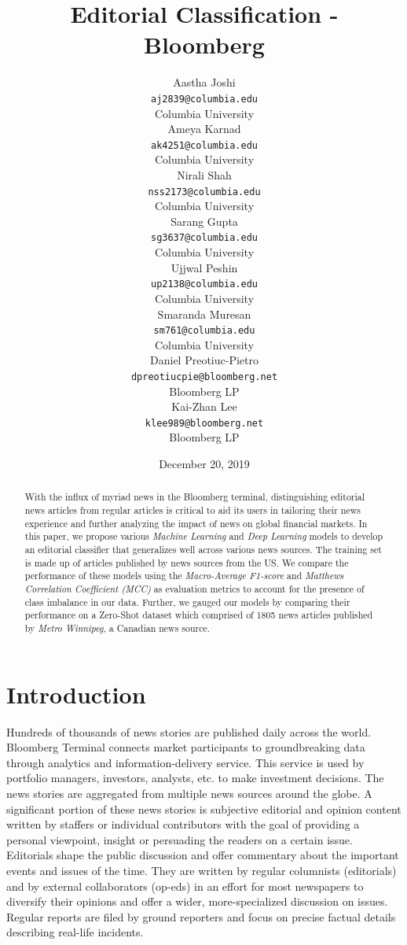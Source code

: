 \documentclass[11pt]{article}
\title{Editorial Classification - Bloomberg\vspace{1em}}
\author{
  Aastha Joshi\\
  \texttt{aj2839@columbia.edu}\\
  Columbia University
  \\\And
  Ameya Karnad\\
  \texttt{ak4251@columbia.edu}\\
  Columbia University
  \\\And
  Nirali Shah\\
  \texttt{nss2173@columbia.edu}\\
  Columbia University
  \\\AND
  Sarang Gupta\\
  \texttt{sg3637@columbia.edu}\\
  Columbia University
  \\\And
  Ujjwal Peshin\\
  \texttt{up2138@columbia.edu}\\
  Columbia University
  \\\And
  Smaranda Muresan\\
  \texttt{sm761@columbia.edu}\\
  Columbia University
  \\\AND
  Daniel Preotiuc-Pietro\\
  \texttt{dpreotiucpie@bloomberg.net}\\
  Bloomberg LP
  \\\And
  Kai-Zhan Lee\\
  \texttt{klee989@bloomberg.net}\\
  Bloomberg LP
  \\\vspace{5em}
}
\date{December 20, 2019}
\begin{document}
\maketitle
\bigskip\bigskip
\bigskip\bigskip


\begin{abstract}
 With the influx of myriad news in the Bloomberg terminal, distinguishing editorial news articles from regular articles is critical to aid its users in tailoring their news experience and further analyzing the impact of news on global financial markets. In this paper, we propose various \textit{Machine Learning} and \textit{Deep Learning} models to develop an editorial classifier that generalizes well across various news sources. The training set is made up of articles published by news sources from the US. We compare the performance of these models using the \textit{Macro-Average F1-score} and \textit{Matthews Correlation Coefficient (MCC)} as evaluation metrics to account for the presence of class imbalance in our data. Further, we gauged our models by comparing their performance on a Zero-Shot dataset which comprised of 1805 news articles published by \textit{Metro Winnipeg}, a Canadian news source. 
\end{abstract}

\medskip


\section{Introduction}
\label{sec:intro}

Hundreds of thousands of news stories are published daily across the world. Bloomberg Terminal connects market participants to groundbreaking data through analytics and information-delivery service. This service is used by portfolio managers, investors, analysts, etc. to make investment decisions. The news stories are aggregated from multiple news sources around the globe. A significant portion of these news stories is subjective editorial and opinion content written by staffers or individual contributors with the goal of providing a personal viewpoint, insight or persuading the readers on a certain issue. Editorials shape the public discussion and offer commentary about the important events and issues of the time. They are written by regular columnists (editorials) and by external collaborators (op-eds) in an effort for most newspapers to diversify their opinions and offer a wider, more-specialized discussion on issues. Regular reports are filed by ground reporters and focus on precise factual details describing real-life incidents. 
\end{document}
